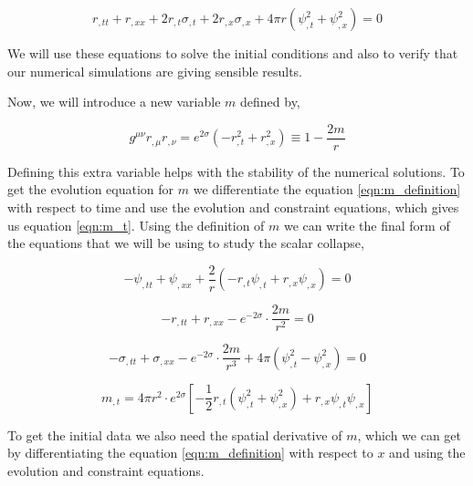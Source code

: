\begin{equation}
    r_{, t t}+r_{, x x}+2 r_{, t} \sigma_{, t}+2 r_{, x} \sigma_{, x}+4 \pi r\left(\psi_{, t}^{2}+\psi_{, x}^{2}\right)=0
    \label{eqn:constraint_2}
\end{equation}

We will use these equations to solve the initial conditions and also to verify that our numerical simulations are giving sensible results.

Now, we will introduce a new variable $m$ defined by,

\begin{equation}
    g^{\mu \nu} r_{, \mu} r_{, \nu}=e^{2 \sigma}\left(-r_{, t}^{2}+r_{, x}^{2}\right) \equiv 1-\frac{2 m}{r}
    \label{eqn:m_definition}
\end{equation}

Defining this extra variable helps with the stability of the numerical solutions.
To get the evolution equation for $m$ we differentiate the equation \ref{eqn:m_definition} with respect to time and use the evolution and constraint equations, which gives us equation \ref{eqn:m_t}. Using the definition of $m$ we can write the final form of the equations that we will be using to study the scalar collapse,


\begin{equation}
    -\psi_{, t t}+\psi_{, x x}+\frac{2}{r}\left(-r_{, t} \psi_{, t}+r_{, x} \psi_{, x}\right)=0
    \label{eqn:psi}
\end{equation}

\begin{equation}
    -r_{, t t}+r_{, x x}-e^{-2 \sigma} \cdot \frac{2 m}{r^{2}}=0
    \label{eqn:r}
\end{equation}

\begin{equation}
    -\sigma_{, t t}+\sigma_{, x x}-e^{-2 \sigma} \cdot \frac{2 m}{r^{3}}+4 \pi\left(\psi_{, t}^{2}-\psi_{, x}^{2}\right)=0
    \label{eqn:sigma}
\end{equation}

\begin{equation}
    m_{, t}=4 \pi r^{2} \cdot e^{2 \sigma}\left[-\frac{1}{2} r_{, t}\left(\psi_{, t}^{2}+\psi_{, x}^{2}\right)+r_{, x} \psi_{, t} \psi_{, x}\right]
    \label{eqn:m_t}
\end{equation}


To get the initial data we also need the spatial derivative of $m$, which we can get by differentiating the equation \ref{eqn:m_definition} with respect to $x$ and using the evolution and constraint equations.

